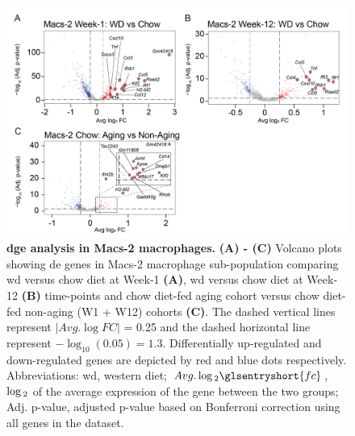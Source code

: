 \begin{figure}[H]
    \centering
    \includegraphics[width=13cm]{Appendix2/Fig/F2-A7-02.png}
    \caption[ analysis in Macs-2 macrophages]{\textbf{\gls{dge} analysis in Macs-2 macrophages.} \textbf{(A) - (C)} Volcano plots showing \gls{de} genes in Macs-2 macrophage sub-population comparing \gls{wd} versus chow diet at Week-1 \textbf{(A)}, \gls{wd} versus chow diet at Week-12 \textbf{(B)} time-points and chow diet-fed aging cohort versus chow diet-fed non-aging (W1 + W12) cohorts \textbf{(C)}. The dashed vertical lines represent $  \left|Avg. \log FC \right| $ = 0.25 and the dashed horizontal line represent $-\log_{10}(\num{0.05}) = 1.3$. Differentially up-regulated and down-regulated genes are depicted by red and blue dots respectively. Abbreviations: \gls{wd}, western diet; $Avg. \log\textsubscript{2} \glsentryshort{fc}$, $\log\textsubscript{2}$  of the average expression of the gene between the two groups; Adj. p-value, adjusted p-value based on Bonferroni correction using all genes in the dataset.}
    \label{fig:app_scrna_macrophages_macs2_dge}
\end{figure}

